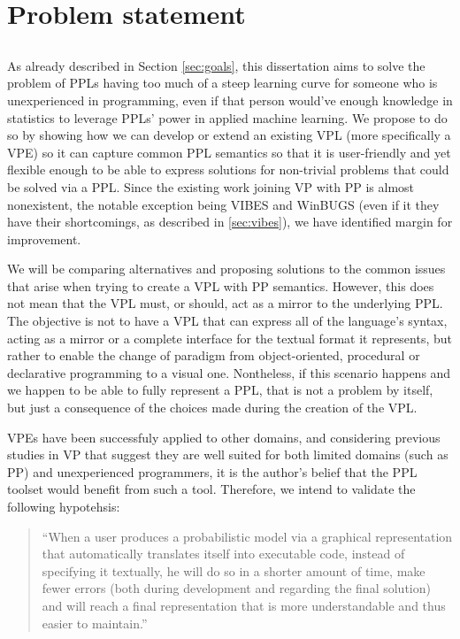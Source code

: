 \chapter{Problem statement}\label{chap:chap3}

\section*{}

As already described in Section \ref{sec:goals}, this dissertation aims to solve
the problem of PPLs having too much of a steep learning curve for someone who
is unexperienced in programming, even if that person would've enough knowledge
in statistics to leverage PPLs' power in applied machine learning. We propose
to do so by showing how we can develop or extend an existing VPL (more specifically
a VPE) so it can capture common PPL semantics so that it is user-friendly
and yet flexible enough to be able to express solutions for non-trivial problems
that could be solved via a PPL. Since the existing work joining VP with PP is almost nonexistent, the notable exception
being VIBES and WinBUGS (even if it they have their shortcomings, as described in \ref{sec:vibes}),
we have identified margin for improvement.

We will be comparing alternatives and proposing solutions to the common issues that
arise when trying to create a VPL with PP semantics. However, this does not mean that
the VPL must, or should, act as a mirror to the underlying PPL. The objective
is not to have a VPL that can express all of the language's syntax, acting as
a mirror or a complete interface for the textual format it represents, but rather
to enable the change of paradigm from object-oriented, procedural or declarative programming
to a visual one. Nontheless, if this scenario happens and we happen to be able
to fully represent a PPL, that is not a problem by itself, but just a consequence
of the choices made during the creation of the VPL.

VPEs have been successfuly applied to other domains, and considering previous studies in VP that suggest they
are well suited for both limited domains (such as PP) and unexperienced programmers, it is the
author's belief that the PPL toolset would benefit from such a tool.
Therefore, we intend to validate the following hypotehsis:

\begin{quote}
  ``When a user produces a probabilistic model via a graphical representation that automatically translates
  itself into executable code, instead of specifying it textually,
  he will do so in a shorter amount of time, make
  fewer errors (both during development and regarding the final solution) and
  will reach a final representation that is more understandable and thus
  easier to maintain.''
\end{quote}

